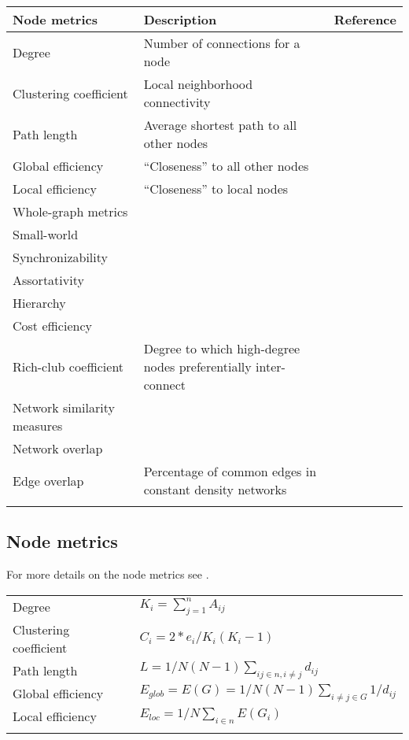 \documentclass{frontiersSCNS} %
\begin{document}
\begin{table}[!t]
{\begin{tabular}{lll}
\midrule
Node metrics & Description & Reference\\\midrule
Degree & Number of connections for a node & \\
Clustering coefficient & Local neighborhood connectivity & \citep{Watts1998}\\
Path length & Average shortest path to all other nodes & \citep{Watts1998}\\
Global efficiency & ``Closeness'' to all other nodes & \citep{Latora2001}\\
Local efficiency & ``Closeness'' to local nodes & \\
\midrule
Whole-graph metrics\\
\midrule
Small-world & & \citep{Watts1998}\\
Synchronizability & & \citep{Motter2005}\\
Assortativity & & \citep{Newman2002}\\
Hierarchy & & \citep{Ravasz2003}\\
Cost efficiency & & \citep{Achard2007}\\
Rich-club coefficient & Degree to which high-degree nodes preferentially inter-connect & \citep{Colizza2006}\\
\midrule
Network similarity measures\\
\midrule
Network overlap & & \citep{vanWijk2010}\\
Edge overlap & Percentage of common edges in constant density networks & \citep{Weber2013} \\\botrule
\end{tabular}}{}
\end{table}

\subsection{Node metrics}
For more details on the node metrics see \citep{Rubinov2010}. 
\begin{table}[!t]
{\begin{tabular}{ll}
\midrule
Degree & $K_i = \sum_{j=1}^{n}{A_{ij}}$\\
Clustering coefficient & $C_i = 2*e_i / K_i ( K_i -1 )$\\
Path length & $L = 1/N(N-1) \sum_{ij \in n, i \neq j}{d_{ij}}$\\
Global efficiency & $E_{glob} = E(G) = 1/N(N-1) \sum_{i \neq j \in G}{1/d_{ij}}$\\
Local efficiency & $E_{loc} = 1/N \sum_{i \in n}{E(G_i)}$\\\botrule
\end{tabular}}{}
\end{table}
\end{document}
